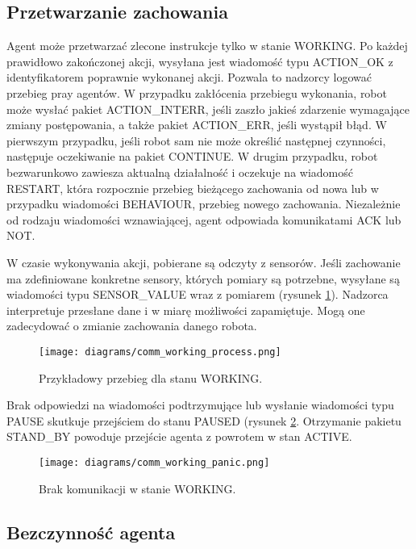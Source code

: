 \subsection{Przetwarzanie zachowania}

Agent może przetwarzać zlecone instrukcje tylko w stanie WORKING. Po każdej prawidłowo zakończonej akcji, wysyłana jest wiadomość typu ACTION\_OK z identyfikatorem poprawnie wykonanej akcji. Pozwala to nadzorcy logować przebieg pray agentów. W przypadku zakłócenia przebiegu wykonania, robot może wysłać pakiet ACTION\_INTERR, jeśli zaszło jakieś zdarzenie wymagające zmiany postępowania, a także pakiet ACTION\_ERR, jeśli wystąpił błąd. W pierwszym przypadku, jeśli robot sam nie może określić następnej czynności, następuje oczekiwanie na pakiet CONTINUE. W drugim przypadku, robot bezwarunkowo zawiesza aktualną działalność i oczekuje na wiadomość RESTART, która rozpocznie przebieg bieżącego zachowania od nowa lub w przypadku wiadomości BEHAVIOUR, przebieg nowego zachowania. Niezależnie od rodzaju wiadomości wznawiającej, agent odpowiada komunikatami ACK lub NOT.

W czasie wykonywania akcji, pobierane są odczyty z sensorów. Jeśli zachowanie ma zdefiniowane konkretne sensory, których pomiary są potrzebne, wysyłane są wiadomości typu SENSOR\_VALUE wraz z pomiarem (rysunek \ref{fig:comm_working_process}). Nadzorca interpretuje przesłane dane i w miarę możliwości zapamiętuje. Mogą one zadecydować o zmianie zachowania danego robota.

\begin{figure}[!ht]
    \centering
        \texttt{[image: diagrams/comm\_working\_process.png]}
    \caption{Przykładowy przebieg dla stanu WORKING.\label{fig:comm_working_process}}
\end{figure}

Brak odpowiedzi na wiadomości podtrzymujące lub wysłanie wiadomości typu PAUSE skutkuje przejściem do stanu PAUSED (rysunek \ref{fig:comm_working_panic}. Otrzymanie pakietu STAND\_BY powoduje przejście agenta z powrotem w stan ACTIVE.

\begin{figure}[!ht]
    \centering
        \texttt{[image: diagrams/comm\_working\_panic.png]}
    \caption{Brak komunikacji w stanie WORKING.\label{fig:comm_working_panic}}
\end{figure}

\subsection{Bezczynność agenta}

